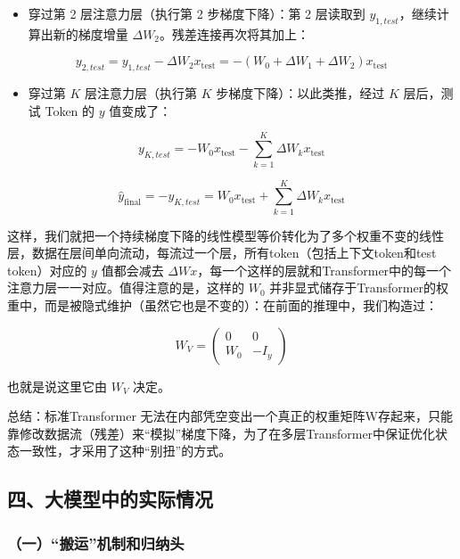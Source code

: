 \begin{itemize}
\tightlist
\item
  穿过第 2 层注意力层（执行第 2 步梯度下降）：第 2 层读取到 \(y_{1,test}\)，继续计算出新的梯度增量 \(\Delta W_2\)。残差连接再次将其加上：
\end{itemize}

\[
y_{2,test}=y_{1,test}-\Delta W_2x_{\mathrm{test}}=-(W_0+\Delta W_1+\Delta W_2)x_{\mathrm{test}}
\]

\begin{itemize}
\tightlist
\item
  穿过第 \(K\) 层注意力层（执行第 \(K\) 步梯度下降）：以此类推，经过 \(K\) 层后，测试 Token 的 \(y\) 值变成了：
\end{itemize}

\[
y_{K,test}=-W_0x_{\mathrm{test}}-\sum_{k=1}^{K}\Delta W_k x_{\mathrm{test}}
\]

\[
\hat{y}_{\mathrm{final}}=-y_{K,test}=W_0x_{\mathrm{test}}+\sum_{k=1}^{K}\Delta W_k x_{\mathrm{test}}
\]

这样，我们就把一个持续梯度下降的线性模型等价转化为了多个权重不变的线性层，数据在层间单向流动，每流过一个层，所有token（包括上下文token和test token）对应的 \(y\) 值都会减去 \(\Delta Wx\)，每一个这样的层就和Transformer中的每一个注意力层一一对应。值得注意的是，这样的 \(W_0\) 并非显式储存于Transformer的权重中，而是被隐式维护（虽然它也是不变的）：在前面的推理中，我们构造过：

\[
W_V=\begin{pmatrix}0&0\\W_0&-I_y\end{pmatrix}
\]

也就是说这里它由 \(W_V\) 决定。

总结：标准Transformer 无法在内部凭空变出一个真正的权重矩阵W存起来，只能靠修改数据流（残差）来``模拟''梯度下降，为了在多层Transformer中保证优化状态一致性，才采用了这种``别扭''的方式。

\hypertarget{ux56dbux5927ux6a21ux578bux4e2dux7684ux5b9eux9645ux60c5ux51b5}{%
\subsection{四、大模型中的实际情况}\label{ux56dbux5927ux6a21ux578bux4e2dux7684ux5b9eux9645ux60c5ux51b5}}

\hypertarget{ux4e00ux642cux8fd0ux673aux5236ux548cux5f52ux7eb3ux5934}{%
\subsubsection{（一）``搬运''机制和归纳头}\label{ux4e00ux642cux8fd0ux673aux5236ux548cux5f52ux7eb3ux5934}}

